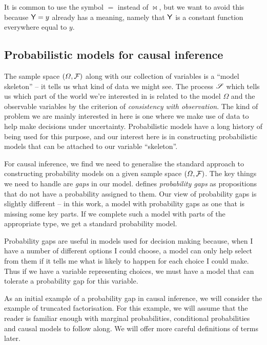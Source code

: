 It is common to use the symbol $=$ instead of $\bowtie$, but we want to avoid this because $\mathsf{Y}=y$ already has a meaning, namely that $\mathsf{Y}$ is a constant function everywhere equal to $y$. 

\subsection{Probabilistic models for causal inference}

The sample space $(\Omega,\mathcal{F})$ along with our collection of variables is a ``model skeleton'' -- it tells us what kind of data we might see. The process $\mathscr{S}$ which tells us which part of the world we're interested in is related to the model $\Omega$ and the observable variables by the criterion of \emph{consistency with observation}. The kind of problem we are mainly interested in here is one where we make use of data to help make decisions under uncertainty. Probabilistic models have a long history of being used for this purpose, and our interest here is in constructing probabilistic models that can be attached to our variable ``skeleton''. 

For causal inference, we find we need to generalise the standard approach to constructing probability models on a given sample space $(\Omega,\mathcal{F})$. The key things we need to handle are \emph{gaps} in our model. \citet{hajek_what_2003} defines \emph{probability gaps} as propositions that do not have a probability assigned to them. Our view of probability gaps is slightly different -- in this work, a model with probability gaps as one that is missing some key parts. If we complete such a model with parts of the appropriate type, we get a standard probability model.

Probability gaps are useful in models used for decision making because, when I have a number of different options I could choose, a model can only help select from them if it tells me what is likely to happen for each choice I could make. Thus if we have a variable representing choices, we must have a model that can tolerate a probability gap for this variable.

As an initial example of a probability gap in causal inference, we will consider the example of truncated factorisation. For this example, we will assume that the reader is familiar enough with marginal probabilities, conditional probabilities and causal models to follow along. We will offer more careful definitions of terms later.

